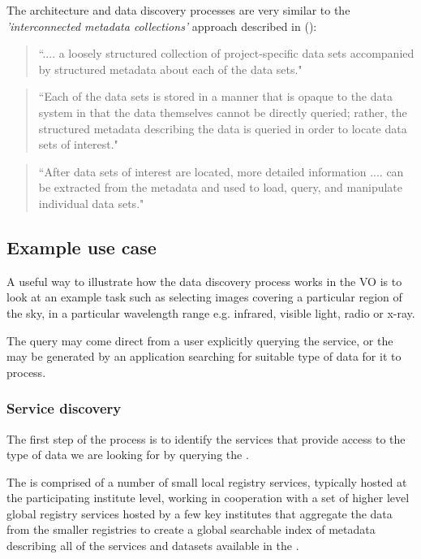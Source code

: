 \documentclass{article}
\begin{document}
The \cite{vo} architecture and data discovery processes are very similar
to the \textit{'interconnected metadata collections'} approach described
in  (\cite{jones-2006}):
\begin{quote}
``.... a loosely structured collection of project-specific data sets
accompanied by structured metadata about each of the data sets."
\end{quote}

\begin{quote}
``Each of the data sets is stored in a manner that is opaque to the data
system in that the data themselves cannot be directly queried; rather,
the structured metadata describing the data is queried in order to locate
data sets of interest."
\end{quote}

\begin{quote}
``After data sets of interest are located, more detailed information .... can
be extracted from the metadata and used to load, query, and manipulate
individual data sets."
\end{quote}

\subsection{Example use case}

A useful way to illustrate how the data discovery process works in the VO
is to look at an example task such as selecting images covering a particular
region of the sky, in a particular wavelength range e.g. infrared, visible light,
radio or x-ray.

The query may come direct from a user explicitly querying the service, or the
may be generated by an application searching for suitable type of data for it
to process.  

\subsubsection{Service discovery}

The first step of the process is to identify the services that provide
access to the type of data we are looking for by querying the \cite{ivoa-reg}.

The \cite{ivoa-reg} is comprised of a number of small local registry
services, typically hosted at the participating institute level, working in
cooperation with a set of higher level global registry services hosted by a
few key institutes that aggregate the data from the smaller registries to
create a global searchable index of metadata describing all of the services
and datasets available in the \cite{vo}.
\end{document}
